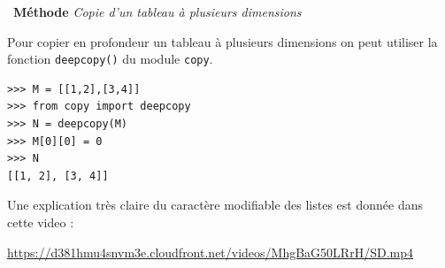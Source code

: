 \documentclass[a4paper, french, 12pt]{article}
\newenvironment{methode}[1]
{\par \medskip    \noindent  
 \begin {bclogo}[arrondi =0.1,logo=\bcoutil, marge=4,noborder = true] {~\textbf{Méthode}   {\itshape #1} }  \par}
{
\end{bclogo}
 \par \bigskip }
\begin{document}
\begin{methode}{Copie d'un tableau à plusieurs dimensions}
\medskip

Pour copier en profondeur un tableau à plusieurs dimensions on peut utiliser la fonction \lstinline{deepcopy()} du module \lstinline{copy}.


\medskip

\begin{minipage}{0.95\linewidth}
\begin{lstlisting}[style=compil]  
>>> M = [[1,2],[3,4]]
>>> from copy import deepcopy
>>> N = deepcopy(M)
>>> M[0][0] = 0
>>> N
[[1, 2], [3, 4]]
\end{lstlisting}
\end{minipage}


Une explication très claire du caractère modifiable des listes est donnée dans cette video :

\begin{center}
	\url{https://d381hmu4snvm3e.cloudfront.net/videos/MhgBaG50LRrH/SD.mp4}
\end{center}

\end{methode}


\vspace*{-20pt}
\end{document}

